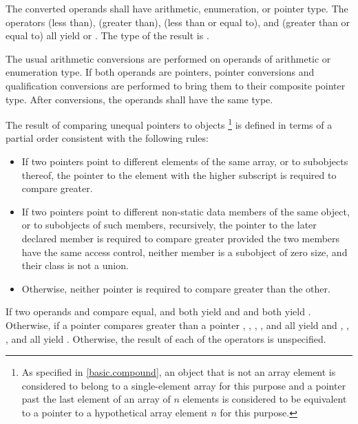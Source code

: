 \pnum
The converted operands shall have arithmetic, enumeration, or pointer type.
The
operators \tcode{<} (less than), \tcode{>} (greater than), \tcode{<=}
(less than or equal to), and \tcode{>=} (greater than or equal to) all
yield  or . The type of the result is
.

\pnum
The usual arithmetic conversions are performed on operands of arithmetic
or enumeration type. If both operands are pointers, pointer
conversions and qualification conversions
are performed to bring
them to their composite pointer type.
After conversions, the operands shall have the same type.

\pnum
The result of comparing unequal pointers to objects%
\footnote{As specified in \ref{basic.compound},
an object that is not an array element
is considered to belong to a
single-element array for this purpose and
a pointer past the last element of an array of $n$ elements
is considered to be equivalent to a pointer to a hypothetical array element
$n$ for this purpose.}
is defined in terms of a partial order consistent with the following rules:

\begin{itemize}
\item If two pointers point to different elements of the same array, or to
subobjects thereof, the pointer to the element with the higher subscript
is required to compare greater.

\item If two pointers point to different non-static data members of the same
object, or to subobjects of such members, recursively,
the pointer to the later declared member is required to compare greater provided
the two members have the same access control,
neither member is a subobject of zero size,
and their class is not a union.

\item Otherwise, neither pointer is required to compare greater than the other.

\end{itemize}

\pnum
If two operands  and  compare equal,
 and  both yield  and  and
 both yield . Otherwise, if a pointer 
compares greater than a pointer , , ,
, and  all yield  and ,
, , and  all yield .
Otherwise, the result of each of the operators is unspecified.

